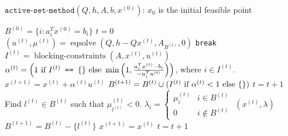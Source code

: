 \begin{algorithm}[H]
\label{algo:active-set-method}
\caption{$\texttt{active-set-method}(Q, h, A, b, x^{(0)})$: $x_0$ is the initial feasible point}
\begin{algorithmic}[1]
\State $B^{(0)} = \{i: a_i^Tx^{(0)} = b_i \}$ \label{alg-line:B0}
\State $t = 0$
        \State $(u^{(t)}, \mu^{(t)}) = \operatorname{eqsolve}(Q, h - Qx^{(t)}, A_{B^{(t)}}, 0)$
            \State \texttt{break}
        \EndIf
        \State $I^{(t)} = \operatorname{blocking-constraints}(A, x^{(t)}, u^{(t)})$
        \State $\alpha^{(t)} = \left(1 \textrm{ if } I^{(t)} \texttt{ == } \{\} \textrm{ else } \min\left(1, \frac{a_i^Tx^{(t)} - b_i}{-a_i^Tu^{(t)}}\right)\right)$, where $i \in I^{(t)}$.
        \State $x^{(t+1)} = x^{(t)} + \alpha^{(t)}u^{(t)}$
        \State $B^{(t+1)} = B^{(t)} \cup (I^{(t)} \textrm{ if } \alpha^{(t)} < 1 \textrm{ else } \{\})$
        \State $t = t + 1$
    \EndWhile
    \State Find $l^{(t)} \in B^{(t)}$ such that $\mu^{(t)}_{l^{(t)}} < 0$.
     \label{alg-line:l-eq-null}
        \State $\lambda_i = \begin{cases} \mu^{(t)}_i & i \in B^{(t)} \\ 0 & i \not\in B^{(t)} \end{cases}$
        \State \Return $(x^{(t)}, \lambda)$
    \Else
        \State $B^{(t+1)} = B^{(t)} - \{l^{(t)}\}$
        \State $x^{(t+1)} = x^{(t)}$
        \State $t = t + 1$
    \EndIf
\EndWhile
\end{algorithmic}
\end{algorithm}

